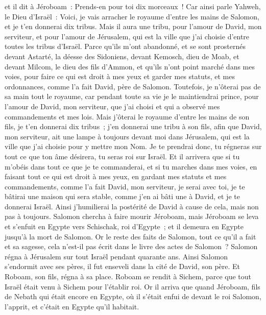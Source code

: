 \begin{multicols}{2}
et il dit à Jéroboam~: Prends-en pour toi dix morceaux~! Car ainsi parle Yahweh, le Dieu d'Israël~: Voici, je vais arracher le royaume d'entre les mains de Salomon, et je t'en donnerai dix tribus.
Mais il aura une tribu, pour l'amour de David, mon serviteur, et pour l'amour de Jérusalem, qui est la ville que j'ai choisie d'entre toutes les tribus d'Israël.
Parce qu'ils m'ont abandonné, et se sont prosternés devant Astarté, la déesse des Sidoniens, devant Kemosch, dieu de Moab, et devant Milcom, le dieu des fils d'Ammon, et qu'ils n'ont point marché dans mes voies, pour faire ce qui est droit à mes yeux et garder mes statuts, et mes ordonnances, comme l'a fait David, père de Salomon.
Toutefois, je n'ôterai pas de sa main tout le royaume, car pendant toute sa vie je le maintiendrai prince, pour l'amour de David, mon serviteur, que j'ai choisi et qui a observé mes commandements et mes lois.
Mais j'ôterai le royaume d'entre les mains de son fils, je t'en donnerai dix tribus~;
j'en donnerai une tribu à son fils, afin que David, mon serviteur, ait une lampe à toujours devant moi dans Jérusalem, qui est la ville que j'ai choisie pour y mettre mon Nom.
Je te prendrai donc, tu régneras sur tout ce que ton âme désirera, tu seras roi sur Israël.
Et il arrivera que si tu m'obéis dans tout ce que je te commanderai, et si tu marches dans mes voies, en faisant tout ce qui est droit à mes yeux, en gardant mes statuts et mes commandements, comme l'a fait David, mon serviteur, je serai avec toi, je te bâtirai une maison qui sera stable, comme j'en ai bâti une à David, et je te donnerai Israël.
Ainsi j'humilierai la postérité de David à cause de cela, mais non pas à toujours.
Salomon chercha à faire mourir Jéroboam, mais Jéroboam se leva et s'enfuit en Egypte vers Schischak, roi d'Egypte~; et il demeura en Egypte jusqu'à la mort de Salomon.
Or le reste des faits de Salomon, tout ce qu'il a fait et sa sagesse, cela n'est-il pas écrit dans le livre des actes de Salomon~?
Salomon régna à Jérusalem sur tout Israël pendant quarante ans.
Ainsi Salomon s'endormit avec ses pères, il fut enseveli dans la cité de David, son père. Et Roboam, son fils, régna à sa place.
\VerseOne{}Roboam se rendit à Sichem, parce que tout Israël était venu à Sichem pour l'établir roi.
Or il arriva que quand Jéroboam, fils de Nebath qui était encore en Egypte, où il s'était enfui de devant le roi Salomon, l'apprit, et c'était en Egypte qu'il habitait.

\end{multicols}
